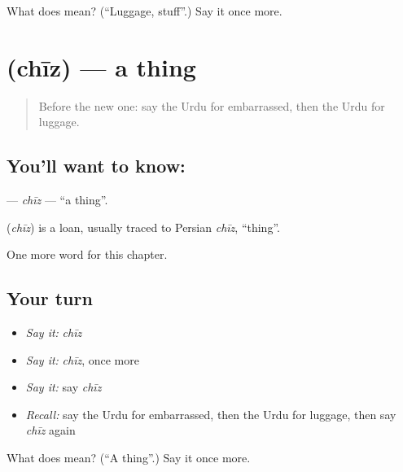 \begin{tcolorbox}[breakable,colback=teal!4,colframe=teal!35!black,title={Before you move on}]
What does  mean? (\textquotedblleft{}Luggage, stuff\textquotedblright{}.) Say it once more.
\end{tcolorbox}
\section[\texorpdfstring{\ur{چیز} (chīz)}{چیز (chīz)}]{ (chīz) — a thing}

\label{lesson:UR-C164-chiz}



\begin{quote}
Before the new one: say the Urdu for embarrassed, then the Urdu for luggage.
\end{quote}

\subsection*{You'll want to know: }
\textbf{} — \emph{chīz} — \textquotedblleft{}a thing\textquotedblright{}.

\begin{cousinweb}
\textbf{} (\emph{chīz}) is a loan, usually traced to Persian \emph{chīz}, \textquotedblleft{}thing\textquotedblright{}.
\end{cousinweb}

\begin{grammarlens}[title={What you've built}]
One more word for this chapter.
\end{grammarlens}

\subsection*{Your turn}
\begin{itemize}
\raggedright
  \item \emph{Say it:} \emph{chīz}
  \item \emph{Say it:} \emph{chīz}, once more
  \item \emph{Say it:} say \emph{chīz}
  \item \emph{Recall:} say the Urdu for embarrassed, then the Urdu for luggage, then say \emph{chīz} again
\end{itemize}

\begin{tcolorbox}[breakable,colback=teal!4,colframe=teal!35!black,title={Before you move on}]
What does  mean? (\textquotedblleft{}A thing\textquotedblright{}.) Say it once more.
\end{tcolorbox}
